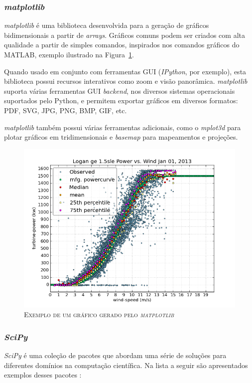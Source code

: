 \subsubsection{\textbf{\textit{matplotlib}}}
\textit{matplotlib} é uma biblioteca desenvolvida para a geração de gráficos bidimensionais a partir de \textit{arrays}. Gráficos comuns podem ser criados com alta qualidade a partir de simples comandos, inspirados nos comandos gráficos do MATLAB, exemplo ilustrado na Figura~\ref{matplotlib-fig}.

Quando usado em conjunto com ferramentas GUI (\textit{IPython}, por exemplo), esta biblioteca possui recursos interativos como zoom e visão panorâmica. \textit{matplotlib} suporta várias ferramentas GUI \textit{backend}, nos diversos sistemas operacionais suportados pelo Python, e permitem exportar gráficos em diversos formatos: PDF, SVG, JPG, PNG, BMP, GIF, etc.

\textit{matplotlib} também possui várias ferramentas adicionais, como o \textit{mplot3d} para plotar gráficos em tridimensionais e \textit{basemap} para mapeamentos e projeções.

\begin{figure}[h!]
  \includegraphics[width=1\textwidth]{Cap4/imagens/matplotlib}
  \caption{\textsc{Exemplo de um gráfico gerado pelo \textit{matplotlib}}}
  \vspace{-0.3cm}
  \label{matplotlib-fig}
\end{figure}


\subsubsection{\textbf{\textit{SciPy}}}
\textit{SciPy} é uma coleção de pacotes que abordam uma série de soluções para diferentes domínios na computação científica. Na lista a seguir são apresentados exemplos desses pacotes \cite{python-analysis}:

